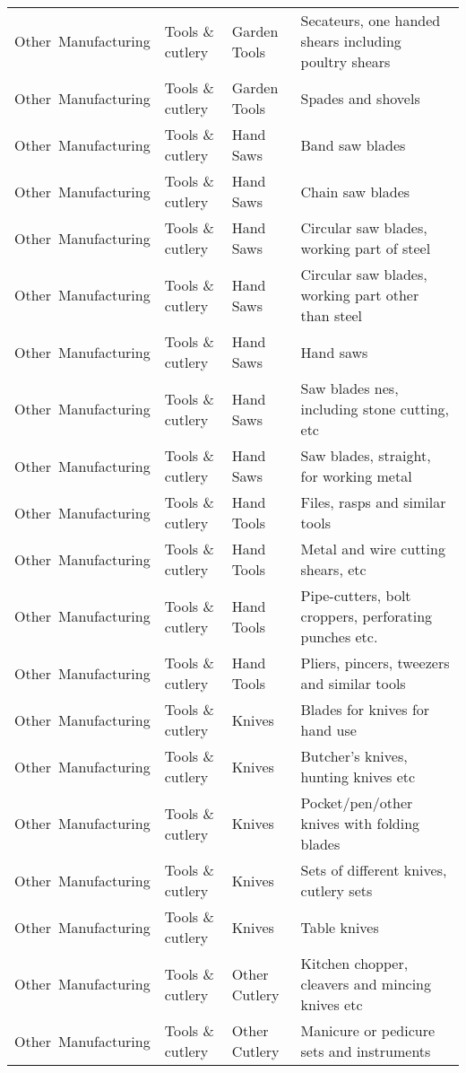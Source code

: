 \begin{appendices}
\begin{xltabular}{\textwidth}{|p{0.11\textwidth}|p{0.29\textwidth}|p{0.20\textwidth}|p{0.30\textwidth}|}
			Other\ Manufacturing & Tools \& cutlery & Garden Tools & Secateurs, one handed shears including poultry shears \\
			Other\ Manufacturing & Tools \& cutlery & Garden Tools & Spades and shovels \\
			Other\ Manufacturing & Tools \& cutlery & Hand Saws & Band saw blades \\
			Other\ Manufacturing & Tools \& cutlery & Hand Saws & Chain saw blades \\
			Other\ Manufacturing & Tools \& cutlery & Hand Saws & Circular saw blades, working part of steel \\
			Other\ Manufacturing & Tools \& cutlery & Hand Saws & Circular saw blades, working part other than steel \\
			Other\ Manufacturing & Tools \& cutlery & Hand Saws & Hand saws \\
			Other\ Manufacturing & Tools \& cutlery & Hand Saws & Saw blades nes, including stone cutting, etc \\
			Other\ Manufacturing & Tools \& cutlery & Hand Saws & Saw blades, straight, for working metal \\
			Other\ Manufacturing & Tools \& cutlery & Hand Tools & Files, rasps and similar tools \\
			Other\ Manufacturing & Tools \& cutlery & Hand Tools & Metal and wire cutting shears, etc \\
			Other\ Manufacturing & Tools \& cutlery & Hand Tools & Pipe-cutters, bolt croppers, perforating punches etc. \\
			Other\ Manufacturing & Tools \& cutlery & Hand Tools & Pliers, pincers, tweezers and similar tools \\
			Other\ Manufacturing & Tools \& cutlery & Knives & Blades for knives for hand use \\
			Other\ Manufacturing & Tools \& cutlery & Knives & Butcher's knives, hunting knives etc \\
			Other\ Manufacturing & Tools \& cutlery & Knives & Pocket/pen/other knives with folding blades \\
			Other\ Manufacturing & Tools \& cutlery & Knives & Sets of different knives, cutlery sets \\
			Other\ Manufacturing & Tools \& cutlery & Knives & Table knives \\
			Other\ Manufacturing & Tools \& cutlery & Other Cutlery & Kitchen chopper, cleavers and mincing knives etc \\
			Other\ Manufacturing & Tools \& cutlery & Other Cutlery & Manicure or pedicure sets and instruments \\

\end{xltabular}
\end{appendices}
